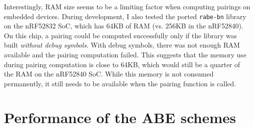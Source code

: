 

Interestingly, RAM size seems to be a limiting factor when computing pairings on embedded devices.
During development, I also tested the ported \texttt{rabe-bn} library on the nRF52832 SoC, which has 64KB of RAM (vs. 256KB in the nRF52840). 
On this chip, a pairing could be computed successfully only if the library was built \emph{without debug symbols}.
With debug symbols, there was not enough RAM available and the pairing computation failed.
This suggests that the memory use during pairing computation is close to 64KB, which would still be a quarter of the RAM on the nRF52840 SoC.
While this memory is not consumed permanently, it still needs to be available when the pairing function is called.

\section{Performance of the ABE schemes}


